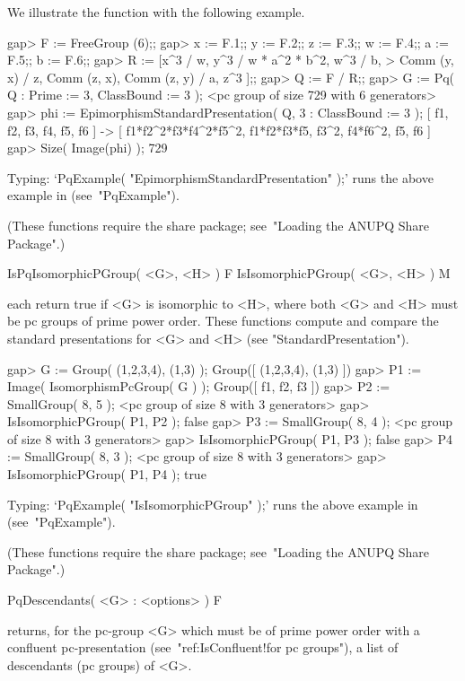 We illustrate the function with the following example.

\beginexample
gap> F := FreeGroup (6);;
gap> x := F.1;; y := F.2;; z := F.3;; w := F.4;; a := F.5;; b := F.6;;
gap> R := [x^3 / w, y^3 / w * a^2 * b^2, w^3 / b,
>          Comm (y, x) / z, Comm (z, x), Comm (z, y) / a, z^3 ];;
gap> Q := F / R;;
gap> G := Pq( Q : Prime := 3, ClassBound := 3 );
<pc group of size 729 with 6 generators>
gap> phi := EpimorphismStandardPresentation( Q, 3 : ClassBound := 3 );
[ f1, f2, f3, f4, f5, f6 ] -> [ f1*f2^2*f3*f4^2*f5^2, f1*f2*f3*f5, f3^2, 
  f4*f6^2, f5, f6 ]
gap> Size( Image(phi) );
729
\endexample

Typing: `PqExample( "EpimorphismStandardPresentation" );' runs the  above
example in {\GAP} (see~"PqExample").

(These functions require the {\ANUPQ}  share  package;  see~"Loading  the
ANUPQ Share Package".)


\>IsPqIsomorphicPGroup( <G>, <H> ) F
\>IsIsomorphicPGroup( <G>, <H> ) M

each return true if <G> is isomorphic to <H>, where both <G> and <H> must
be pc groups of prime power order. These functions  compute  and  compare
the standard presentations for <G> and <H> (see "StandardPresentation").

\beginexample
gap> G := Group( (1,2,3,4), (1,3) );
Group([ (1,2,3,4), (1,3) ])
gap> P1 := Image( IsomorphismPcGroup( G ) );
Group([ f1, f2, f3 ])
gap> P2 := SmallGroup( 8, 5 );
<pc group of size 8 with 3 generators>
gap> IsIsomorphicPGroup( P1, P2 );
false
gap> P3 := SmallGroup( 8, 4 );
<pc group of size 8 with 3 generators>
gap> IsIsomorphicPGroup( P1, P3 );
false
gap> P4 := SmallGroup( 8, 3 );
<pc group of size 8 with 3 generators>
gap> IsIsomorphicPGroup( P1, P4 );
true
\endexample

Typing: `PqExample( "IsIsomorphicPGroup" );' runs the  above  example  in
{\GAP} (see~"PqExample").

(These functions require the {\ANUPQ}  share  package;  see~"Loading  the
ANUPQ Share Package".)


\>PqDescendants( <G> : <options> ) F

returns, for the pc-group <G> which must be of prime power order  with  a
confluent pc-presentation (see~"ref:IsConfluent!for pc groups"),  a  list
of descendants (pc groups) of <G>.

